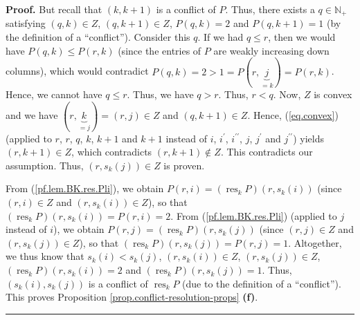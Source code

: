 \documentclass[numbers=enddot,12pt,final,onecolumn,notitlepage]{scrartcl}%
\theoremstyle{definition}
\newenvironment{proof}[1][Proof]{\noindent\textbf{#1.} }{\ \rule{0.5em}{0.5em}}
\newenvironment{noncompile}{}{}
\begin{document}
\begin{noncompile}
\begin{proof}
But recall that $\left(  k,k+1\right)  $ is a conflict of $P$. Thus, there
exists a $q\in\mathbb{N}_{+}$ satisfying $\left(  q,k\right)  \in Z$, $\left(
q,k+1\right)  \in Z$, $P\left(  q,k\right)  =2$ and $P\left(  q,k+1\right)
=1$ (by the definition of a \textquotedblleft conflict\textquotedblright).
Consider this $q$. If we had $q\leq r$, then we would have $P\left(
q,k\right)  \leq P\left(  r,k\right)  $ (since the entries of $P$ are weakly
increasing down columns), which would contradict $P\left(  q,k\right)
=2>1=P\left(  r,\underbrace{j}_{=k}\right)  =P\left(  r,k\right)  $. Hence, we
cannot have $q\leq r$. Thus, we have $q>r$. Thus, $r<q$. Now, $Z$ is convex
and we have $\left(  r,\underbrace{k}_{=j}\right)  =\left(  r,j\right)  \in Z$
and $\left(  q,k+1\right)  \in Z$. Hence, (\ref{eq.convex}) (applied to $r$,
$r$, $q$, $k$, $k+1$ and $k+1$ instead of $i$, $i^{\prime}$, $i^{\prime\prime
}$, $j$, $j^{\prime}$ and $j^{\prime\prime}$) yields $\left(  r,k+1\right)
\in Z$, which contradicts $\left(  r,k+1\right)  \notin Z$. This contradicts
our assumption. Thus, $\left(  r,s_{k}\left(  j\right)  \right)  \in Z$ is proven.

From (\ref{pf.lem.BK.res.Pli}), we obtain $P\left(  r,i\right)  =\left(
\operatorname*{res}\nolimits_{k}P\right)  \left(  r,s_{k}\left(  i\right)
\right)  $ (since $\left(  r,i\right)  \in Z$ and $\left(  r,s_{k}\left(
i\right)  \right)  \in Z$), so that $\left(  \operatorname*{res}%
\nolimits_{k}P\right)  \left(  r,s_{k}\left(  i\right)  \right)  =P\left(
r,i\right)  =2$. From (\ref{pf.lem.BK.res.Pli}) (applied to $j$ instead of
$i$), we obtain $P\left(  r,j\right)  =\left(  \operatorname*{res}%
\nolimits_{k}P\right)  \left(  r,s_{k}\left(  j\right)  \right)  $ (since
$\left(  r,j\right)  \in Z$ and $\left(  r,s_{k}\left(  j\right)  \right)  \in
Z$), so that $\left(  \operatorname*{res}\nolimits_{k}P\right)  \left(
r,s_{k}\left(  j\right)  \right)  =P\left(  r,j\right)  =1$. Altogether, we
thus know that $s_{k}\left(  i\right)  <s_{k}\left(  j\right)  $, $\left(
r,s_{k}\left(  i\right)  \right)  \in Z$, $\left(  r,s_{k}\left(  j\right)
\right)  \in Z$, $\left(  \operatorname*{res}\nolimits_{k}P\right)  \left(
r,s_{k}\left(  i\right)  \right)  =2$ and $\left(  \operatorname*{res}%
\nolimits_{k}P\right)  \left(  r,s_{k}\left(  j\right)  \right)  =1$. Thus,
$\left(  s_{k}\left(  i\right)  ,s_{k}\left(  j\right)  \right)  $ is a
conflict of $\operatorname*{res}\nolimits_{k}P$ (due to the definition of a
\textquotedblleft conflict\textquotedblright). This proves Proposition
\ref{prop.conflict-resolution-props} \textbf{(f)}.
\end{proof}
\end{noncompile}
\end{document}
